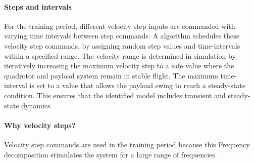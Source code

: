     \paragraph{Steps and intervals}
    For the training period, different velocity step inputs are commanded with varying time intervals between step commands.
    A algorithm schedules these velocity step commands, by assigning random step values and time-intervals within a specified range.
    The velocity range is determined in simulation by iteratively increasing the maximum velocity step 
    to a safe value where the quadrotor and payload system remain in stable flight.
    The maximum time-interval is set to a value that allows the payload swing to reach a steady-state condition.
    This ensures that the identified model includes transient and steady-state dynamics.

    \paragraph{Why velocity steps?}
    Velocity step commands are used in the training period because this 
    Frequency decomposition stimulates the system for a large range of frequencies.
    
